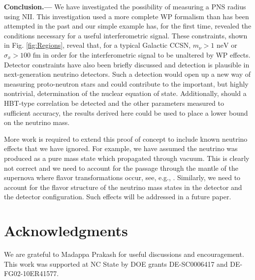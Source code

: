 \documentclass[aps,prl,reprint,floatfix
]{revtex4-1}
\newcommand{\heading}[1]{\textbf{#1.---}}
\begin{document}
\heading{Conclusion}
We have investigated the possibility of measuring a PNS radius using NII. This investigation used a more complete WP formalism than has been attempted in the past and our simple example has, for the first time, revealed the conditions necessary for a useful interferometric signal. These constraints, shown in Fig. \ref{fig:Regions}, reveal that, for a typical Galactic CCSN, $m_\nu>1\text{ neV}$ or $\sigma_x>100\text{ fm}$ in order for the interferometric signal to be unaltered by WP effects. Detector constraints have also been briefly discussed and detection is plausible in next-generation neutrino detectors. Such a detection would open up a new way of measuring proto-neutron stars and could contribute to the important, but highly nontrivial, determination of the nuclear equation of state. Additionally, should a HBT-type correlation be detected and the other parameters measured to sufficient accuracy, the results derived here could be used to place a lower bound on the neutrino mass.

More work is required to extend this proof of concept to include known neutrino effects that we have ignored. For example, we have assumed the neutrino was produced as a pure mass state which propagated through vacuum. This is clearly not correct and we need to account for the passage through the mantle of the supernova where flavor transformations occur, see, e.g., \cite{2000PhRvD..62c3007D,2006PhRvL..97x1101D,2009PhRvL.103g1101G,2009JPhG...36k3201D,2010PhRvL.104s1102F}. Similarly, we need to account for the flavor structure of the neutrino mass states in the detector and the detector configuration. Such effects will be addressed in a future paper. 

\section{Acknowledgments}
We are grateful to Madappa Prakash for useful discussions and encouragement. 
This work was supported at NC State by DOE grants DE-SC0006417 and DE-FG02-10ER41577.




\end{document}
